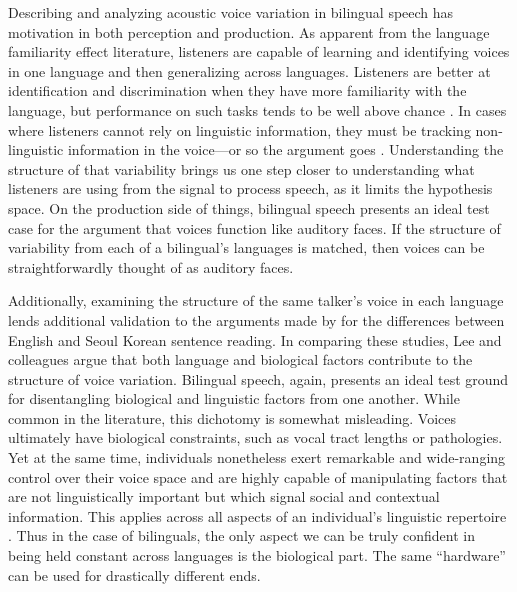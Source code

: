 Describing and analyzing acoustic voice variation in bilingual speech has motivation in both perception and production. As apparent from the language familiarity effect literature, listeners are capable of learning and identifying voices in one language and then generalizing across languages. Listeners are better at identification and discrimination when they have more familiarity with the language, but performance on such tasks tends to be well above chance \citep[e.g.,][]{orena_2019_identifying}. In cases where listeners cannot rely on linguistic information, they must be tracking non-linguistic information in the voice---or so the argument goes \citep{perrachione_2019_judgments}. Understanding the structure of that variability brings us one step closer to understanding what listeners are using from the signal to process speech, as it limits the hypothesis space. On the production side of things, bilingual speech presents an ideal test case for the argument that voices function like auditory faces. If the structure of variability from each of a bilingual's languages is matched, then voices can be straightforwardly thought of as auditory faces. 

Additionally, examining the structure of the same talker's voice in each language lends additional validation to the arguments made by \citet{lee_2020_language} for the differences between English and Seoul Korean sentence reading. In comparing these studies, Lee and colleagues argue that both language and biological factors contribute to the structure of voice variation. Bilingual speech, again, presents an ideal test ground for disentangling biological and linguistic factors from one another. While common in the literature, this dichotomy is somewhat misleading. Voices ultimately have biological constraints, such as vocal tract lengths or pathologies. Yet at the same time, individuals nonetheless exert remarkable and wide-ranging control over their voice space and are highly capable of manipulating factors that are not linguistically important but which signal social and contextual information. This applies across all aspects of an individual's linguistic repertoire \citep{bullock_2009_sociophonetics,wei_2018_translanguaging}. Thus in the case of bilinguals, the only aspect we can be truly confident in being held constant across languages is the biological part. The same ``hardware'' can be used for drastically different ends. 

